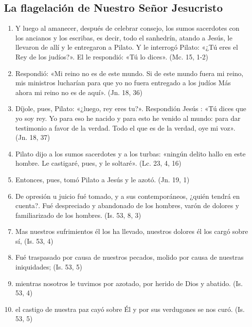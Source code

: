 \documentclass[a4paper,11pt]{article}
\begin{document}
    \subsection*{\hfil La flagelación de Nuestro Señor Jesucristo \hfil}
      
      \begin{enumerate}
        
        \item Y luego al amanecer, después de celebrar consejo, los sumos sacerdotes con los ancianos y los escribas, es decir, todo el sanhedrín, atando a Jesús,
        le llevaron de allí y le entregaron a Pilato. Y le interrogó Pilato: «¿Tú eres el Rey de los judíos?». El le respondió: «Tú lo dices». (Mc. 15, 1-2)

        \item Respondió: «Mi reino no es de este mundo. Si de este mundo fuera mi reino, mis ministros lucharían para que yo no fuera entregado a los judíos
        Más ahora mi reino no es de aquí». (Jn. 18, 36)

        \item Díjole, pues, Pilato: «¿luego, rey eres tu?». Respondión Jesús : «Tú dices que yo soy rey. Yo para eso he nacido y para esto he venido
        al mundo: para dar testimonio a favor de la verdad. Todo el que es de la verdad, oye mi voz». (Jn. 18, 37)

        \item Pilato dijo a los sumos sacerdotes y a los turbas: «ningún delito hallo en este hombre. 
        Le castigaré, pues, y le soltaré». (Lc. 23, 4, 16)

        \item Entonces, pues, tomó Pilato a Jesús y le azotó. (Jn. 19, 1)

        \item De opresión u juicio fué tomado, y a sus contemporáneos, ¿quién tendrá en cuenta?. Fué despreciado y abandonado de los hombres,
        varón de dolores y familiarizado de los hombres. (Is. 53, 8, 3)

        \item Mas nuestros sufrimientos él los ha llevado, nuestros dolores él los cargó sobre sí, (Is. 53, 4)

        \item Fué traspasado por causa de nuestros pecados, molido por causa de nuestras iniquidades; (Is. 53, 5)

        \item mientras nosotros le tuvimos por azotado, por herido de Dios y abatido. (Is. 53, 4)

        \item el castigo de nuestra paz cayó sobre Él y por sus verdugones se nos curó. (Is. 53, 5)

      \end{enumerate}
      
\end{document}
